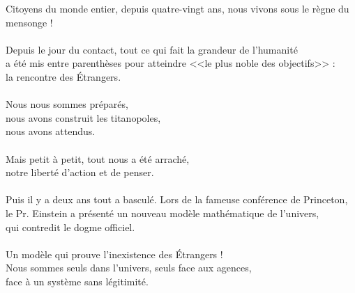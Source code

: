 \documentclass[11pt,twoside,a4paper]{article}
\begin{document}
\begin{center} \begin{bfseries} \begin{scshape}

\pagecolor{yellowPassed}


\textcolor{titlered}{\LARGE Citoyens du monde entier, }
\textcolor{titlered}{\LARGE depuis quatre-vingt ans, }
\textcolor{titlered}{\LARGE nous vivons sous le r{\`e}gne du mensonge ! }~\\

~\\

Depuis le jour du contact, tout ce qui fait la grandeur de l'humanit{\'e}~\\
a {\'e}t{\'e} mis entre parenth{\`e}ses pour atteindre <<le plus noble des objectifs>> :~\\
la rencontre des {\'E}trangers.~\\

~\\

Nous nous sommes pr{\'e}par{\'e}s, ~\\nous avons construit les titanopoles, ~\\
nous avons attendus.~\\

~\\

Mais petit {\`a} petit, tout nous a {\'e}t{\'e} arrach{\'e}, ~\\
notre libert{\'e} d'action et de penser.~\\ 

~\\

Puis il y a deux ans tout a bascul{\'e}. Lors de la fameuse conf{\'e}rence de Princeton, ~\\
le Pr. Einstein a pr{\'e}sent{\'e} un nouveau mod{\`e}le math{\'e}matique de l'univers, ~\\
qui contredit le dogme officiel.~\\ 

~\\

Un mod{\`e}le qui prouve l'inexistence des {\'E}trangers ! ~\\
Nous sommes seuls dans l'univers, seuls face aux agences, ~\\
face {\`a} un syst{\`e}me sans l{\'e}gitimit{\'e}.~\\

~\\


\end{scshape}
\end{bfseries}
\end{center}
\end{document}

